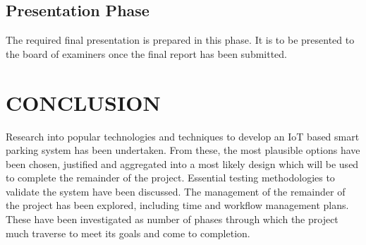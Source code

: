 \documentclass[10pt,twocolumn]{witseiepaper}
\begin{document}
	\subsection{Presentation Phase}
		The required final presentation is prepared in this phase. It is to be presented to the board of examiners once the final report has been submitted.
	

\section{CONCLUSION}

Research into popular technologies and techniques to develop an IoT based smart parking system has been undertaken. From these, the most plausible options have been chosen, justified and aggregated into a most likely design which will be used to complete the remainder of the project. Essential testing methodologies to validate the system have been discussed. The management of the remainder of the project has been explored, including time and workflow management plans. These have been investigated as number of phases through which the project much traverse to meet its goals and come to completion.

{}

\end{document}
